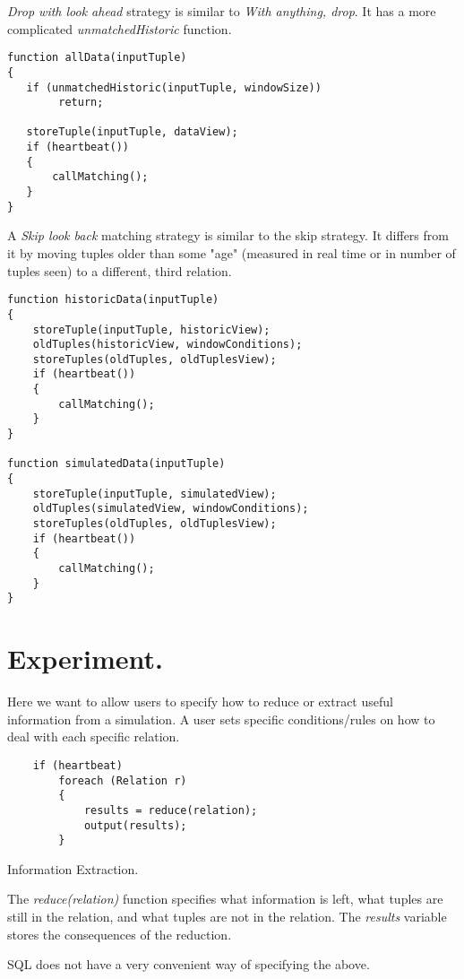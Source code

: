 \documentclass{article}
\begin{document}
\noindent \emph{Drop with look ahead} strategy is similar to \emph{With anything, drop}. It has a more complicated \emph{unmatchedHistoric} function.
\begin{verbatim}     
function allData(inputTuple)
{
   if (unmatchedHistoric(inputTuple, windowSize))
        return;
    
   storeTuple(inputTuple, dataView);
   if (heartbeat())
   {
       callMatching();
   }
}
\end{verbatim}

\noindent A \emph{Skip look back} matching strategy is similar to the skip strategy. It differs from it by moving tuples older than some "age" (measured in real time or in number of tuples seen) to a different, third relation.
\begin{verbatim}   
function historicData(inputTuple)
{
    storeTuple(inputTuple, historicView);
    oldTuples(historicView, windowConditions);
    storeTuples(oldTuples, oldTuplesView);
    if (heartbeat())
    {
        callMatching();
    }
}

function simulatedData(inputTuple)
{
    storeTuple(inputTuple, simulatedView);
    oldTuples(simulatedView, windowConditions);
    storeTuples(oldTuples, oldTuplesView);
    if (heartbeat())
    {
        callMatching();
    }
}
\end{verbatim}

\section{Experiment.}

Here we want to allow users to specify how to reduce or extract useful information from a simulation. A user sets specific conditions/rules on how to deal with each specific relation. 

\begin{program}
    \begin{verbatim}  
    if (heartbeat) 
        foreach (Relation r)
        {
            results = reduce(relation);
            output(results);
        }
    \end{verbatim}
\caption{Information Extraction.}
\end{program}

The \emph{reduce(relation)} function specifies what information is left, what tuples are still in the relation, and what tuples are not in the relation. The \emph{results} variable stores the consequences of the reduction. 

SQL does not have a very convenient way of specifying the above.
\end{document}
